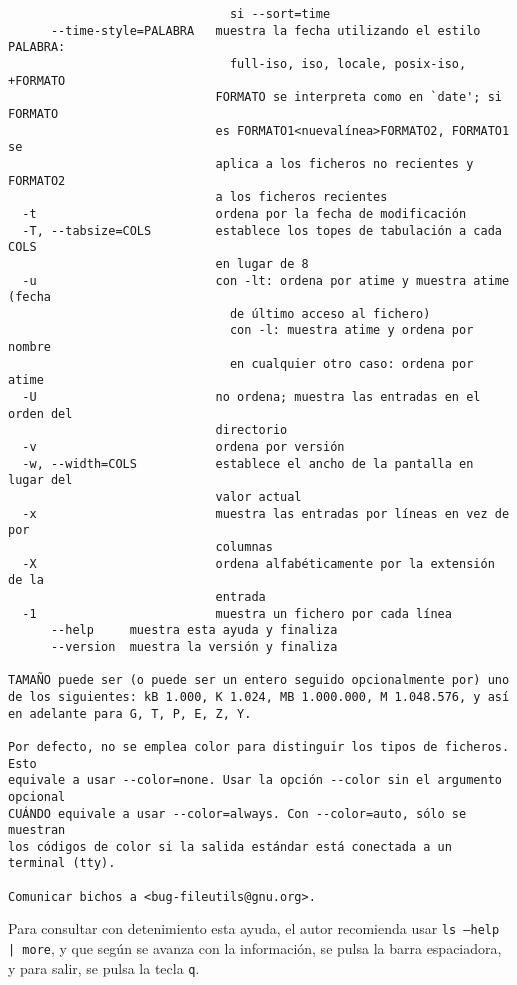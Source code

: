\begin{verbatim}
                               si --sort=time
      --time-style=PALABRA   muestra la fecha utilizando el estilo PALABRA:
                               full-iso, iso, locale, posix-iso, +FORMATO
                             FORMATO se interpreta como en `date'; si FORMATO
                             es FORMATO1<nuevalínea>FORMATO2, FORMATO1 se
                             aplica a los ficheros no recientes y FORMATO2
                             a los ficheros recientes
  -t                         ordena por la fecha de modificación
  -T, --tabsize=COLS         establece los topes de tabulación a cada COLS
                             en lugar de 8
  -u                         con -lt: ordena por atime y muestra atime (fecha
                               de último acceso al fichero)
                               con -l: muestra atime y ordena por nombre
                               en cualquier otro caso: ordena por atime
  -U                         no ordena; muestra las entradas en el orden del
                             directorio
  -v                         ordena por versión
  -w, --width=COLS           establece el ancho de la pantalla en lugar del
                             valor actual
  -x                         muestra las entradas por líneas en vez de por
                             columnas
  -X                         ordena alfabéticamente por la extensión de la
                             entrada
  -1                         muestra un fichero por cada línea
      --help     muestra esta ayuda y finaliza
      --version  muestra la versión y finaliza

TAMAÑO puede ser (o puede ser un entero seguido opcionalmente por) uno
de los siguientes: kB 1.000, K 1.024, MB 1.000.000, M 1.048.576, y así
en adelante para G, T, P, E, Z, Y.

Por defecto, no se emplea color para distinguir los tipos de ficheros. Esto
equivale a usar --color=none. Usar la opción --color sin el argumento opcional
CUÁNDO equivale a usar --color=always. Con --color=auto, sólo se muestran
los códigos de color si la salida estándar está conectada a un terminal (tty).

Comunicar bichos a <bug-fileutils@gnu.org>.
\end{verbatim}


Para consultar con detenimiento esta ayuda, el autor recomienda usar
{\tt ls --help | more}, y que según se avanza con la información, se
pulsa la barra espaciadora, y para salir, se pulsa la tecla {\tt q}.

